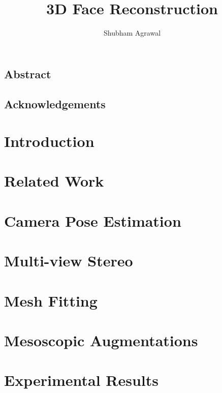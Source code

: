 \documentclass[twoside,10pt]{report}
\newcommand\blankpage{%
    \null
    \thispagestyle{empty}%
    \addtocounter{page}{-1}%
    \newpage}
\newcommand{\clearemptydoublepage}{\newpage{\pagestyle{empty}\cleardoublepage}}
\begin{document}
\title{3D Face Reconstruction}
\author{Shubham Agrawal}



\clearpage
\newpage
\afterpage{\blankpage}
\clearemptydoublepage
\setcounter{page}{1}

\begin{centering} \section*{Abstract} \end{centering}


\newpage
\begin{centering} \section*{Acknowledgements} \end{centering}


\tableofcontents
\clearpage

\clearpage \listoffigures
\clearpage \listoftables

\setcounter{page}{1}


\chapter{Introduction}
\label{chap:introduction}


\chapter{Related Work}
\label{chap:related}


\chapter{Camera Pose Estimation}
\label{chap:pose}


\chapter{Multi-view Stereo}
\label{chap:mvs}


\chapter{Mesh Fitting}
\label{chap:meshfitting}


\chapter{Mesoscopic Augmentations}
\label{chap:augmentations}



\chapter{Experimental Results}
\label{chap:experiments}



\clearpage

 
{\small }
\end{document}
